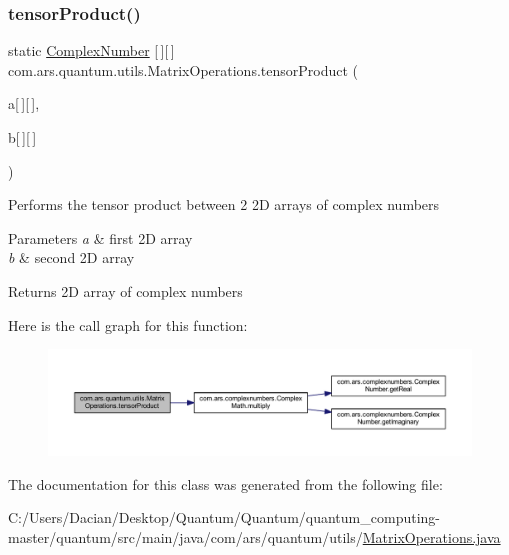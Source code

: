 \subsubsection{\texorpdfstring{tensor\+Product()}{tensorProduct()}\hspace{0.1cm}{\footnotesize\ttfamily [2/2]}}
{\footnotesize\ttfamily static \hyperlink{classcom_1_1ars_1_1complexnumbers_1_1_complex_number}{Complex\+Number} \mbox{[}$\,$\mbox{]}\mbox{[}$\,$\mbox{]} com.\+ars.\+quantum.\+utils.\+Matrix\+Operations.\+tensor\+Product (\begin{DoxyParamCaption}\item[{\hyperlink{classcom_1_1ars_1_1complexnumbers_1_1_complex_number}{Complex\+Number}}]{a\mbox{[}$\,$\mbox{]}\mbox{[}$\,$\mbox{]},  }\item[{\hyperlink{classcom_1_1ars_1_1complexnumbers_1_1_complex_number}{Complex\+Number}}]{b\mbox{[}$\,$\mbox{]}\mbox{[}$\,$\mbox{]} }\end{DoxyParamCaption})\hspace{0.3cm}{\ttfamily [static]}}

Performs the tensor product between 2 2D arrays of complex numbers


\begin{DoxyParams}{Parameters}
{\em a} & first 2D array \\
\hline
{\em b} & second 2D array \\
\hline
\end{DoxyParams}
\begin{DoxyReturn}{Returns}
2D array of complex numbers 
\end{DoxyReturn}
Here is the call graph for this function\+:
\nopagebreak
\begin{figure}[H]
\begin{center}
\leavevmode
\includegraphics[width=350pt]{classcom_1_1ars_1_1quantum_1_1utils_1_1_matrix_operations_ab603ff7c94e923390ba21bbedbde64bf_cgraph}
\end{center}
\end{figure}


The documentation for this class was generated from the following file\+:\begin{DoxyCompactItemize}
\item 
C\+:/\+Users/\+Dacian/\+Desktop/\+Quantum/\+Quantum/quantum\+\_\+computing-\/master/quantum/src/main/java/com/ars/quantum/utils/\hyperlink{_matrix_operations_8java}{Matrix\+Operations.\+java}\end{DoxyCompactItemize}
